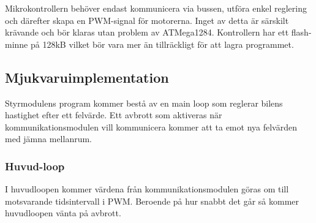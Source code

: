 \documentclass[designspec/spec.tex]{subfiles}
\begin{document}
Mikrokontrollern behöver endast kommunicera via bussen, utföra enkel reglering
och därefter skapa en PWM-signal för motorerna. Inget av detta är särskilt
krävande och bör klaras utan problem av ATMega1284. Kontrollern har ett
flash-minne på 128kB vilket bör vara mer än tillräckligt för att lagra
programmet.

\subsection{Mjukvaruimplementation}
Styrmodulens program kommer bestå av en main loop som reglerar bilens hastighet
efter ett felvärde. Ett avbrott som aktiveras när kommunikationsmodulen vill
kommunicera kommer att ta emot nya felvärden med jämna mellanrum.

\subsubsection{Huvud-loop}
I huvudloopen kommer värdena från kommunikationsmodulen göras om till
motsvarande tidsintervall i PWM. Beroende på hur snabbt det går så kommer
huvudloopen vänta på avbrott.

%
\end{document}
